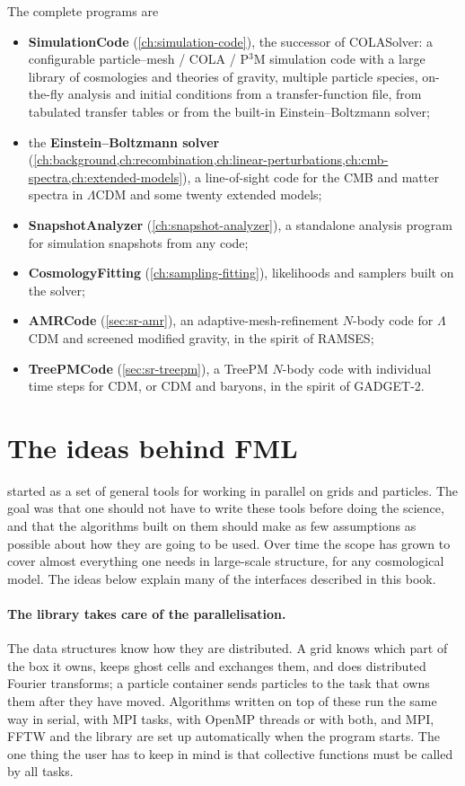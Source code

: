 The complete programs are
\begin{itemize}
\item \textbf{SimulationCode} (\cref{ch:simulation-code}), the successor of COLASolver: a configurable particle--mesh /
      COLA / P$^3$M simulation code with a large library of cosmologies and theories of gravity, multiple particle
      species, on-the-fly analysis and initial conditions from a transfer-function file, from tabulated transfer tables
      or from the built-in Einstein--Boltzmann solver;
\item the \textbf{Einstein--Boltzmann solver} (\cref{ch:background,ch:recombination,ch:linear-perturbations,ch:cmb-spectra,ch:extended-models}),
      a line-of-sight code for the CMB and matter spectra in $\Lambda$CDM and some twenty extended models;
\item \textbf{SnapshotAnalyzer} (\cref{ch:snapshot-analyzer}), a standalone analysis program for simulation snapshots
      from any code;
\item \textbf{CosmologyFitting} (\cref{ch:sampling-fitting}), likelihoods and samplers built on the solver;
\item \textbf{AMRCode} (\cref{sec:sr-amr}), an adaptive-mesh-refinement $N$-body code for $\Lambda$CDM and screened
      modified gravity, in the spirit of RAMSES;
\item \textbf{TreePMCode} (\cref{sec:sr-treepm}), a TreePM $N$-body code with individual time steps for CDM, or CDM and
      baryons, in the spirit of GADGET-2.
\end{itemize}

\section{The ideas behind FML}

\fml{} started as a set of general tools for working in parallel on grids and particles. The goal was that one should
not have to write these tools before doing the science, and that the algorithms built on them should make as few
assumptions as possible about how they are going to be used. Over time the scope has grown to cover almost everything
one needs in large-scale structure, for any cosmological model. The ideas below explain many of the interfaces
described in this book.

\paragraph*{The library takes care of the parallelisation.} The data structures know how they are distributed. A grid
knows which part of the box it owns, keeps ghost cells and exchanges them, and does distributed Fourier transforms; a
particle container sends particles to the task that owns them after they have moved. Algorithms written on top of
these run the same way in serial, with MPI tasks, with OpenMP threads or with both, and MPI, FFTW and the library are
set up automatically when the program starts. The one thing the user has to keep in mind is that collective functions
must be called by all tasks.


